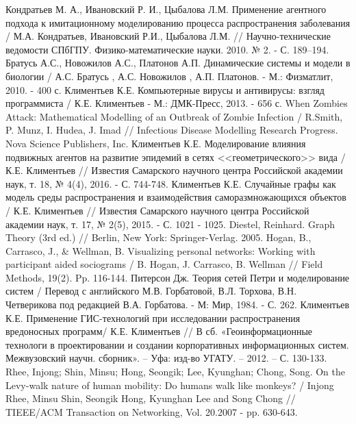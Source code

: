 \newpage
\parindent=1cm %

\begin{thebibliography}{}
	  Кондратьев М. А.,	Ивановский Р. И.,	Цыбалова Л.М. Применение агентного подхода к имитационному моделированию процесса распространения заболевания / М.А. Кондратьев, Ивановский Р.И., Цыбалова Л.М. // Научно-технические ведомости СПбГПУ. Физико-математические науки. 2010. № 2. - С. 189–194.
	 Братусь А.С., Новожилов А.С., Платонов А.П. Динамические системы и модели в биологии /   А.С. Братусь , А.С. Новожилов ,  А.П. Платонов. - М.: Физматлит, 2010. -  400 с.
	 Климентьев К.Е. Компьютерные вирусы и антивирусы: взгляд программиста / К.Е. Климентьев - М.: ДМК-Пресс, 2013. - 656 с.
	 When Zombies Attack: Mathematical Modelling of an Outbreak of Zombie Infection / R.Smith, P. Munz, I. Hudea, J. Imad // Infectious Disease Modelling Research Progress. Nova Science Publishers, Inc.
	 Климентьев К.Е. Моделирование влияния подвижных агентов на развитие эпидемий  в сетях <<геометрического>> вида / К.Е. Климентьев  // Известия Самарского научного центра Российской академии наук, т. 18, № 4(4), 2016. - С. 744-748.
	Климентьев К.Е. Случайные графы как модель среды распространения и взаимодействия саморазмножающихся объектов / К.Е. Климентьев  // Известия Самарского научного центра Российской академии наук, т. 17, № 2(5), 2015. - С. 1021 - 1025.
	 Diestel, Reinhard. Graph Theory (3rd ed.) // Berlin, New York: Springer-Verlag. 2005.
	 Hogan, B., Carrasco, J., \& Wellman, B. Visualizing personal networks: Working with participant aided sociograms / B. Hogan, J. Carrasco, B. Wellman // Field Methods, 19(2).  Pp. 116-144.
	Питерсон Дж. Теория сетей Петри и моделирование систем / Перевод с английского М.В. Горбатовой, В.Л. Торхова, В.Н. Четверикова под редакцией В.А. Горбатова. - М: Мир, 1984. - С. 262.
	 Климентьев К.Е. Применение ГИС-технологий при исследовании распространения
	вредоносных программ/ К.Е. Климентьев  // В сб. «Геоинформационные технологи в проектировании и создании корпоративных
	информационных систем. Межвузовский научн. сборник». – Уфа: изд-во УГАТУ. – 2012. – С. 130-133. 
	 Rhee, Injong; Shin, Minsu; Hong, Seongik; Lee, Kyunghan; Chong, Song. On the Levy-walk nature of human mobility: Do humans walk like monkeys? / Injong Rhee, Minsu Shin, Seongik Hong, Kyunghan Lee and Song Chong // TIEEE/ACM Transaction on Networking, Vol. 20.2007 - pp. 630-643.

\end{thebibliography}

